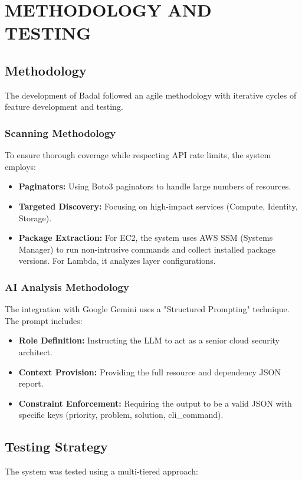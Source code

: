 \chapter{\MakeUppercase{Methodology and Testing}}

\section{Methodology}
The development of Badal followed an agile methodology with iterative cycles of feature development and testing.

\subsection{Scanning Methodology}
To ensure thorough coverage while respecting API rate limits, the system employs:
\begin{itemize}
    \item \textbf{Paginators:} Using Boto3 paginators to handle large numbers of resources.
    \item \textbf{Targeted Discovery:} Focusing on high-impact services (Compute, Identity, Storage).
    \item \textbf{Package Extraction:} For EC2, the system uses AWS SSM (Systems Manager) to run non-intrusive commands and collect installed package versions. For Lambda, it analyzes layer configurations.
\end{itemize}

\subsection{AI Analysis Methodology}
The integration with Google Gemini uses a "Structured Prompting" technique. The prompt includes:
\begin{itemize}
    \item \textbf{Role Definition:} Instructing the LLM to act as a senior cloud security architect.
    \item \textbf{Context Provision:} Providing the full resource and dependency JSON report.
    \item \textbf{Constraint Enforcement:} Requiring the output to be a valid JSON with specific keys (priority, problem, solution, cli_command).
\end{itemize}

\section{Testing Strategy}
The system was tested using a multi-tiered approach:

